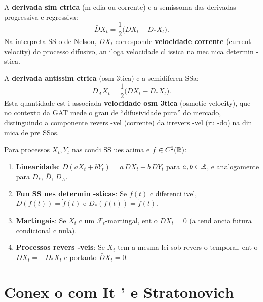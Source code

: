 \begin{defi}
A \textbf{derivada sim ctrica} (m cdia ou corrente) c a semissoma das derivadas progressiva e regressiva:
\begin{equation}
 \bar{D}X_t = \frac{1}{2}\bigl(DX_t + D_*X_t\bigr).
\end{equation}
Na interpreta SS o de Nelson, $\bar{D}X_t$ corresponde \textbf{velocidade corrente} (current velocity) do processo difusivo, an iloga velocidade cl issica na mec nica determin -stica.
\end{defi}

\begin{defi}
A \textbf{derivada antissim ctrica} (osm 3tica) c a semidiferen SSa:
\begin{equation}
 D_A X_t = \frac{1}{2}\bigl(DX_t - D_*X_t\bigr).
\end{equation}
Esta quantidade est i associada \textbf{velocidade osm 3tica} (osmotic velocity), que no contexto da GAT mede o grau de ``difusividade pura'' do mercado, distinguindo a componente revers -vel (corrente) da irrevers -vel (ru -do) na din mica de pre SSos.
\end{defi}

\begin{prop}
Para processos $X_t, Y_t$ nas condi SS ues acima e $f\in C^2(\mathbb{R})$:
\begin{enumerate}
 \item \textbf{Linearidade}: $D(aX_t + bY_t) = a\,DX_t + b\,DY_t$ para $a,b\in\mathbb{R}$, e analogamente para $D_*$, $\bar{D}$, $D_A$.
 \item \textbf{Fun SS ues determin -sticas}: Se $f(t)$ c diferenci ivel, $D(f(t))=\dot f(t)$ e $D_*(f(t))=\dot f(t)$.
 \item \textbf{Martingais}: Se $X_t$ c um $\mathcal{F}_t$-martingal, ent o $DX_t = 0$ (a tend ancia futura condicional c nula).
 \item \textbf{Processos revers -veis}: Se $X_t$ tem a mesma lei sob revers o temporal, ent o $DX_t = -D_*X_t$ e portanto $\bar{D}X_t = 0$.
\end{enumerate}
\end{prop}

\section{Conex o com It ' e Stratonovich}
\label{sec:nelson_conexao}

